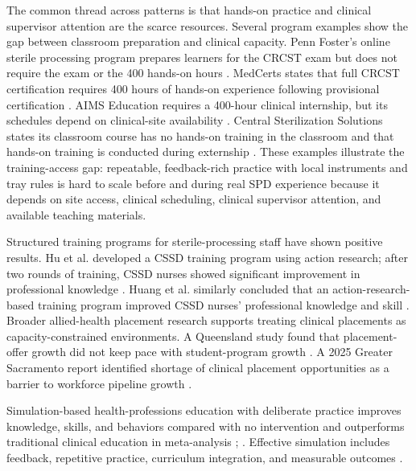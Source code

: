 \documentclass[10pt,a4paper]{article}
\begin{document}
The common thread across patterns is that hands-on practice and clinical supervisor attention are the scarce resources. Several program examples show the gap between classroom preparation and clinical capacity. Penn Foster's online sterile processing program prepares learners for the CRCST exam but does not require the exam or the 400 hands-on hours \cite{penn-foster-sterile-processing-accessed-2026}. MedCerts states that full CRCST certification requires 400 hours of hands-on experience following provisional certification \cite{medcerts-catalog-2025}. AIMS Education requires a 400-hour clinical internship, but its schedules depend on clinical-site availability \cite{aims-education-sterile-processing-accessed-2026}. Central Sterilization Solutions states its classroom course has no hands-on training in the classroom and that hands-on training is conducted during externship \cite{central-sterilization-solutions-in-person-accessed-2026}. These examples illustrate the training-access gap: repeatable, feedback-rich practice with local instruments and tray rules is hard to scale before and during real SPD experience because it depends on site access, clinical scheduling, clinical supervisor attention, and available teaching materials.

Structured training programs for sterile-processing staff have shown positive results. Hu et al. developed a CSSD training program using action research; after two rounds of training, CSSD nurses showed significant improvement in professional knowledge \cite{hu-et-al-2024}. Huang et al. similarly concluded that an action-research-based training program improved CSSD nurses' professional knowledge and skill \cite{huang-et-al-2025}. Broader allied-health placement research supports treating clinical placements as capacity-constrained environments. A Queensland study found that placement-offer growth did not keep pace with student-program growth \cite{mcbride-et-al-2020}. A 2025 Greater Sacramento report identified shortage of clinical placement opportunities as a barrier to workforce pipeline growth \cite{north-greater-sacramento-coe-2025}.

Simulation-based health-professions education with deliberate practice improves knowledge, skills, and behaviors compared with no intervention and outperforms traditional clinical education in meta-analysis \cite{cook-et-al-2011}; \cite{mcgaghie-et-al-2011}. Effective simulation includes feedback, repetitive practice, curriculum integration, and measurable outcomes \cite{issenberg-et-al-2005}.
\end{document}
